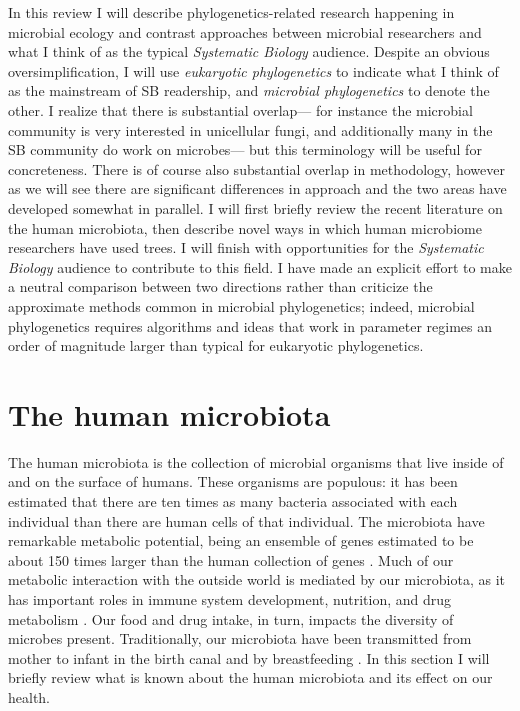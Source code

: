 \documentclass{amsart}
\begin{document}
In this review I will describe phylogenetics-related research happening in microbial ecology and contrast approaches between microbial researchers and what I think of as the typical \emph{Systematic Biology} audience.
Despite an obvious oversimplification, I will use \textit{eukaryotic phylogenetics} to indicate what I think of as the mainstream of SB readership, and \textit{microbial phylogenetics} to denote the other.
I realize that there is substantial overlap--- for instance the microbial community is very interested in unicellular fungi, and additionally many in the SB community do work on microbes--- but this terminology will be useful for concreteness.
There is of course also substantial overlap in methodology, however as we will see there are significant differences in approach and the two areas have developed somewhat in parallel.
I will first briefly review the recent literature on the human microbiota, then describe novel ways in which human microbiome researchers have used trees.
I will finish with opportunities for the \textit{Systematic Biology} audience to contribute to this field.
I have made an explicit effort to make a neutral comparison between two directions rather than criticize the approximate methods common in microbial phylogenetics; indeed, microbial phylogenetics requires algorithms and ideas that work in parameter regimes an order of magnitude larger than typical for eukaryotic phylogenetics.

\section{The human microbiota}
The human microbiota is the collection of microbial organisms that live inside of and on the surface of humans.
These organisms are populous: it has been estimated that there are ten times as many bacteria associated with each individual than there are human cells of that individual.
The microbiota have remarkable metabolic potential, being an ensemble of genes estimated to be about 150 times larger than the human collection of genes \citep{qin2010human}.
Much of our metabolic interaction with the outside world is mediated by our microbiota, as it has important roles in immune system development, nutrition, and drug metabolism \citep{kau2011human,maurice2013xenobiotics}.
Our food and drug intake, in turn, impacts the diversity of microbes present.
Traditionally, our microbiota have been transmitted from mother to infant in the birth canal and by breastfeeding \citep[reviewed in][]{funkhouser2013mom}.
In this section I will briefly review what is known about the human microbiota and its effect on our health.
\end{document}

